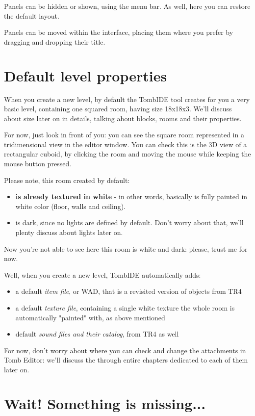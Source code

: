 Panels can be hidden or shown, using the  menu bar. As well, here you can restore the default layout.
\par Panels can be moved within the interface, placing them where you prefer by dragging and dropping their title.

\section{Default level properties}
When you create a new level, by default the TombIDE tool creates for you a very basic level, containing one squared room, having size 18x18x3.
We'll discuss about size later on in details, talking about blocks, rooms and their properties.
\par For now, just look in front of you: you can see the square room represented in a tridimensional view in the editor window. You can check this is the 3D view of a rectangular cuboid, by  clicking the room and moving the mouse while keeping the mouse button pressed.
\par Please note, this room created by default:
\begin{itemize}
    \item \textbf{is already textured in white} - in other words, basically is fully painted in white color (floor, walls and ceiling).
    \item is dark, since no lights are defined by default. Don't worry about that, we'll plenty discuss about lights later on.
\end{itemize}
Now you're not able to see here this room is white and dark: please, trust me for now.
\par Well, when you create a new level, TombIDE automatically adds:
\begin{itemize}
    \item a default \emph{item file}, or WAD, that is a revisited version of objects from TR4
    \item a default \emph{texture file}, containing a single white texture the whole room is automatically "painted" with, as above mentioned
    \item default \emph{sound files and their catalog}, from TR4 as well
\end{itemize}
For now, don't worry about where you can check and change the attachments in Tomb Editor: we'll discuss the through entire chapters dedicated to each of them later on.

\section{Wait! Something is missing...}

